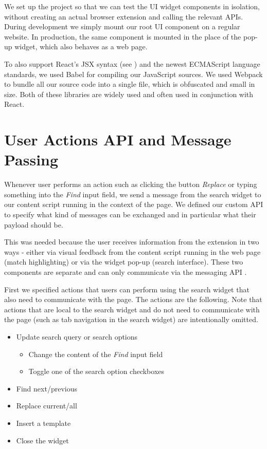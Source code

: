 \documentclass[bsc,frontabs,twoside,singlespacing,parskip,deptreport]{infthesis}
\providecommand{\tightlist}{%
  \setlength{\itemsep}{0pt}\setlength{\parskip}{0pt}}
\begin{document}
We set up the project so that we can test the UI widget components in isolation, without creating an actual browser extension and calling the relevant APIs. During development we simply mount our root UI component on a regular website. In production, the same component is mounted in the place of the pop-up widget, which also behaves as a web page.

To also support React's JSX syntax (see \cite{A5}) and the newest ECMAScript language standards, we used Babel \cite{A6} for compiling our JavaScript sources. We used Webpack \cite{A7} to bundle all our source code into a single file, which is obfuscated and small in size. Both of these libraries are widely used and often used in conjunction with React.

\section{User Actions API and Message Passing}
Whenever user performs an action such as clicking the button \textit{Replace} or typing something into the \textit{Find} input field, we send a message from the search widget to our content script running in the context of the page. We defined our custom API to specify what kind of messages can be exchanged and in particular what their payload should be.

This was needed because the user receives information from the extension in two ways - either via visual feedback from the content script running in the web page (match highlighting) or via the widget pop-up (search interface). These two components are separate and can only communicate via the messaging API \cite{C5}.

First we specified actions that users can perform using the search widget that also need to communicate with the page. The actions are the following. Note that actions that are local to the search widget and do not need to communicate with the page (such as tab navigation in the search widget) are intentionally omitted.

\begin{itemize}
\tightlist
\item
  Update search query or search options
  \begin{itemize}
  \tightlist
  \item
    Change the content of the \textit{Find} input field
  \item
    Toggle one of the search option checkboxes
  \end{itemize}
\item
  Find next/previous
\item
  Replace current/all
\item
  Insert a template
\item
  Close the widget
\end{itemize}
\end{document}
